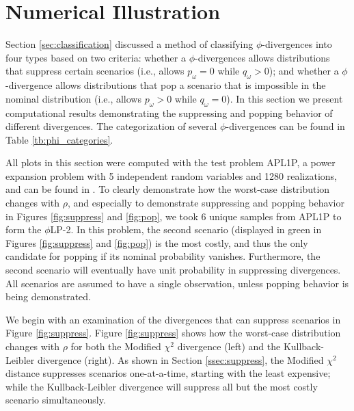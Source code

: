 \documentclass[ijoc,letterpaper]{informs3} %
\newcommand{\plp}{$\phi$LP-2}
\begin{document}
\section{Numerical Illustration} \label{sec:comp_results}

Section \ref{sec:classification} discussed a method of classifying $\phi$-divergences into four types based on two criteria: whether a $\phi$-divergences allows distributions that suppress certain scenarios (i.e., allows $p_\omega = 0$ while $q_\omega > 0$); and whether a $\phi$-divergence allows distributions that pop a scenario that is impossible in the nominal distribution (i.e., allows $p_\omega > 0$ while $q_\omega = 0$).
In this section we present computational results demonstrating the suppressing and popping behavior of different divergences.
The categorization of several $\phi$-divergences can be found in Table \ref{tb:phi_categories}.

All plots in this section were computed with the test problem APL1P, a power expansion problem with 5 independent random variables and 1280 realizations, and can be found in \cite{infanger1992monte}.
To clearly demonstrate how the worst-case distribution changes with $\rho$, and especially to demonstrate suppressing and popping behavior in Figures \ref{fig:suppress} and \ref{fig:pop}, we took 6 unique samples from APL1P to form the \plp.
In this problem, the second scenario (displayed in green in Figures \ref{fig:suppress} and \ref{fig:pop}) is the most costly, and thus the only candidate for popping if its nominal probability vanishes.
Furthermore, the second scenario will eventually have unit probability in suppressing divergences.
All scenarios are assumed to have a single observation, unless popping behavior is being demonstrated.

We begin with an examination of the divergences that can suppress scenarios in Figure \ref{fig:suppress}.
Figure \ref{fig:suppress} shows how the worst-case distribution changes with $\rho$ for both the Modified $\chi^2$ divergence (left) and the Kullback-Leibler divergence (right).
As shown in Section \ref{ssec:suppress}, the Modified $\chi^2$ distance suppresses scenarios one-at-a-time, starting with the least expensive; while the Kullback-Leibler divergence will suppress all but the most costly scenario simultaneously.
\end{document}
